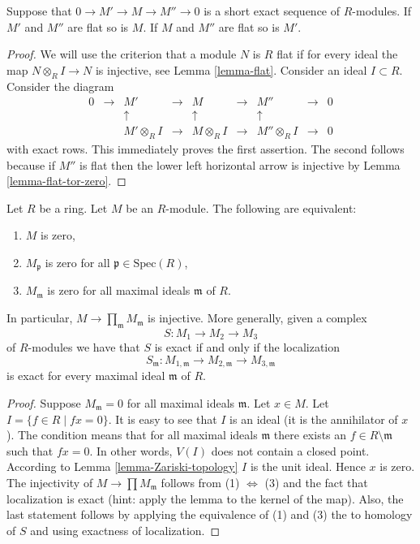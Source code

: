 \begin{lemma}
\label{lemma-flat-ses}
Suppose that $0 \to M' \to M \to M''\to 0$ is
a short exact sequence of $R$-modules.
If $M'$ and $M''$ are flat so is $M$.
If $M$ and $M''$ are flat so is $M'$.
\end{lemma}

\begin{proof}
We will use the criterion that a module $N$ is $R$ flat if for
every ideal the map $N\otimes_RI \to N$ is injective,
see Lemma \ref{lemma-flat}.
Consider an ideal $I \subset R$.
Consider the diagram
$$
\begin{matrix}
0
&
\to
&
M'
&
\to
&
M
&
\to
&
M''
&
\to
&
0
\\
&
&
\uparrow
&
&
\uparrow
&
&
\uparrow
&
&
\\
&
&
M'\otimes_R I
&
\to
&
M\otimes_R I
&
\to
&
M''\otimes_R I
&
\to
&
0
\end{matrix}
$$
with exact rows. This immediately proves the first assertion.
The second follows because if $M''$ is flat then the lower left
horizontal arrow is injective by Lemma \ref{lemma-flat-tor-zero}.
\end{proof}

\begin{lemma}
\label{lemma-characterize-zero-local}
Let $R$ be a ring.
Let $M$ be an $R$-module. The following are equivalent:
\begin{enumerate}
\item $M$ is zero,
\item $M_{\mathfrak p}$ is zero for all $\mathfrak p \in \text{Spec}(R)$,
\item $M_{\mathfrak m}$ is zero for all maximal ideals $\mathfrak m$ of $R$.
\end{enumerate}
In particular, $M \to \prod_{\mathfrak m} M_{\mathfrak m}$ is injective.
More generally, given a complex
$$
S : M_1 \to M_2 \to M_3
$$
of $R$-modules we have that $S$ is exact if and only if
the localization
$$
S_{\mathfrak m} :
M_{1, \mathfrak m} \to M_{2, \mathfrak m} \to M_{3, \mathfrak m}
$$
is exact for every maximal ideal $\mathfrak m$ of $R$.
\end{lemma}

\begin{proof}
Suppose $M_{\mathfrak m} = 0$ for all maximal ideals $\mathfrak m$.
Let $x \in M$. Let $I = \{f \in R \mid fx = 0\}$.
It is easy to see that $I$ is an ideal (it is the
annihilator of $x$). The condition means that for
all maximal ideals $\mathfrak m$ there exists an
$f \in R \setminus \mathfrak m$ such that $fx =0$.
In other words, $V(I)$ does not contain a closed point.
According to Lemma \ref{lemma-Zariski-topology} $I$ is the unit ideal.
Hence $x$ is zero. The injectivity of $M \to \prod M_{\mathfrak m}$
follows from (1) $\Leftrightarrow$ (3)
and the fact that localization is exact (hint: apply the
lemma to the kernel of the map).
Also, the last statement follows by applying the equivalence of
(1) and (3) the to homology of $S$ and using exactness of localization.
\end{proof}

